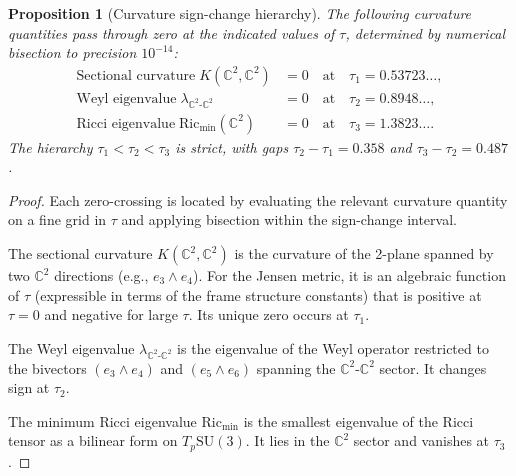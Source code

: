 \documentclass[12pt]{article}
\newtheorem{proposition}[theorem]{Proposition}
\theoremstyle{definition}
\theoremstyle{remark}
\begin{document}
\begin{proposition}[Curvature sign-change hierarchy]
\label{thm:hierarchy}
The following curvature quantities pass through zero at the indicated values of $\tau$, determined by numerical bisection to precision $10^{-14}$:
\begin{align}
\text{Sectional curvature}\; K(\mathbb{C}^2,\mathbb{C}^2) &= 0 \quad \text{at} \quad \tau_1 = 0.53723\ldots, \label{eq:tau1}\\
\text{Weyl eigenvalue}\; \lambda_{\mathbb{C}^2\text{-}\mathbb{C}^2} &= 0 \quad \text{at} \quad \tau_2 = 0.8948\ldots, \label{eq:tau2}\\
\text{Ricci eigenvalue}\; \mathrm{Ric}_{\min}(\mathbb{C}^2) &= 0 \quad \text{at} \quad \tau_3 = 1.3823\ldots. \label{eq:tau3}
\end{align}
The hierarchy $\tau_1<\tau_2<\tau_3$ is strict, with gaps $\tau_2-\tau_1=0.358$ and $\tau_3-\tau_2=0.487$.
\end{proposition}

\begin{proof}
Each zero-crossing is located by evaluating the relevant curvature quantity on a fine grid in $\tau$ and applying bisection within the sign-change interval.

The sectional curvature $K(\mathbb{C}^2,\mathbb{C}^2)$ is the curvature of the 2-plane spanned by two $\mathbb{C}^2$ directions (e.g., $e_3\wedge e_4$).  For the Jensen metric, it is an algebraic function of $\tau$ (expressible in terms of the frame structure constants) that is positive at $\tau=0$ and negative for large $\tau$.  Its unique zero occurs at $\tau_1$.

The Weyl eigenvalue $\lambda_{\mathbb{C}^2\text{-}\mathbb{C}^2}$ is the eigenvalue of the Weyl operator restricted to the bivectors $(e_3\wedge e_4)$ and $(e_5\wedge e_6)$ spanning the $\mathbb{C}^2$-$\mathbb{C}^2$ sector.  It changes sign at $\tau_2$.

The minimum Ricci eigenvalue $\mathrm{Ric}_{\min}$ is the smallest eigenvalue of the Ricci tensor as a bilinear form on $T_p\mathrm{SU}(3)$.  It lies in the $\mathbb{C}^2$ sector and vanishes at $\tau_3$.
\end{proof}
\end{document}
